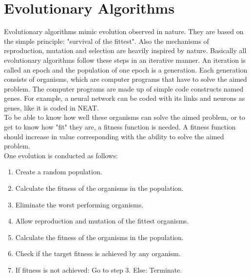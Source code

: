 \section{Evolutionary Algorithms}\label{sec:evoalgo}
Evolutionary algorithms mimic evolution observed in nature. They are based on the simple principle: "survival of the fittest". Also the mechanisms of reproduction, mutation and selection are heavily inspired by nature. Basically all evolutionary algorithms follow these steps in an iterative manner. An iteration is called an epoch and the population of one epoch is a generation. Each generation consists of organisms, which are computer programs that have to solve the aimed problem. The computer programs are made up of simple code constructs named genes. For example, a neural network can be coded with its links and neurons as genes, like it is coded in NEAT.\\
To be able to know how well these organisms can solve the aimed problem, or to get to know how "fit" they are, a fitness function is needed. A fitness function should increase in value corresponding with the ability to solve the aimed problem.\\
One evolution is conducted as follows:
\begin{enumerate}
	\item{Create a random population.}
	\item{Calculate the fitness of the organisms in the population.}
	\item{Eliminate the worst performing organisms.}
	\item{Allow reproduction and mutation of the fittest organisms.}
	\item{Calculate the fitness of the organisms in the population.}
	\item{Check if the target fitness is achieved by any organism.}
	\item{If fitness is not achieved: Go to step 3. Else: Terminate.}
\end{enumerate}
